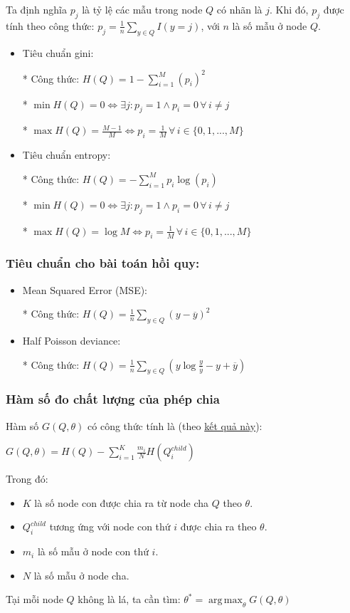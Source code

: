 \documentclass[12pt, a4paper]{article}
\begin{document}
Ta định nghĩa $p_j$ là tỷ lệ các mẫu trong node $Q$ có nhãn là $j$. Khi đó, $p_j$ được tính theo công thức: $p_j = \frac{1}{n}\sum_{y\in Q}I(y = j)$, với $n$ là số mẫu ở node $Q$.
\begin{itemize}
    \item Tiêu chuẩn gini: 
        
    * Công thức: $H(Q) = 1 - \sum_{i = 1}^{M}(p_{i})^{2}$
    
    * $\min {H(Q)} = 0 \Leftrightarrow \exists j: p_j = 1 \land p_i = 0 \, \forall \, i \ne j$
    
    * $\max {H(Q)} = \frac{M-1}{M} \Leftrightarrow p_i = \frac{1}{M} \, \forall \, i \in \{0,1,...,M\}$
    
    \item Tiêu chuẩn entropy:
    
    * Công thức: $H(Q) = - \sum_{i = 1}^{M}p_{i}\log{(p_{i})}$
    
    * $\min {H(Q)} = 0 \Leftrightarrow \exists j: p_j = 1 \land p_i = 0 \, \forall \, i \ne j$
    
    * $\max {H(Q)} = \log{M} \Leftrightarrow p_i = \frac{1}{M} \, \forall \, i \in \{0,1,...,M\}$
\end{itemize}

\subsubsection{Tiêu chuẩn cho  bài toán hồi quy:}
\begin{itemize}
    \item Mean Squared Error (MSE):
    
    * Công thức: $H(Q) = \frac{1}{n}\sum_{y \in Q}(y-\overline{y})^{2}$
    
    \item Half Poisson deviance:
    
    * Công thức: $H(Q) = \frac{1}{n}\sum_{y \in Q}(y\log{\frac{y}{\overline{y}}}- y + \overline{y})$
\end{itemize}

\subsubsection{Hàm số đo chất lượng của phép chia}
Hàm số $G(Q, \theta)$ có công thức tính là (theo \href{https://www.youtube.com/watch?v=jVh5NA9ERDA&list=PLqnslRFeH2Upcrywf-u2etjdxxkL8nl7E&index=8}{kết quả n\`ay}):
\begin{center}
$G(Q, \theta) = H(Q) -  \sum_{i=1}^{K}\frac{m_i}{N}H(Q_i^{child})$ 
\end{center}
Trong đó: 
\begin{itemize}
    \item $K$ là số node con được chia ra từ node cha $Q$ theo $\theta$. 
    \item $Q^{child}_i$ tương ứng với node con thứ $i$ được chia ra theo $\theta$.
    \item $m_i$ là số mẫu ở node con thứ $i$.
    \item $N$ là số mẫu ở node cha.
\end{itemize} 
Tại mỗi node $Q$ không là lá, ta cần tìm: $\theta^{*} = \operatorname*{arg\,max}_\theta G(Q, \theta)$
\end{document}
